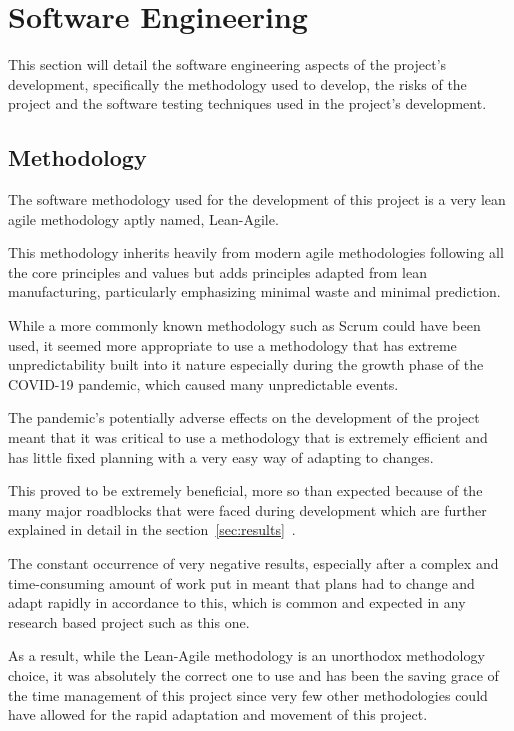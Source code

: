 \documentclass[12pt]{article}
\newcommand{\sentence}{} %
\newcommand{\fullref}[1]{\ref{#1}~\nameref{#1}}
\begin{document}
    \pagebreak


    \section{Software Engineering}\label{sec:software-engineering}

    \tab
    This section will detail the software engineering aspects of the project's development, specifically the
    methodology used to develop, the risks of the project and the software testing techniques used in the project's
    development.

    \subsection{Methodology}\label{subsec:methodology}

    \tab
    The software methodology used for the development of this project is a very lean agile methodology aptly named,
    Lean-Agile.
    \sentence
    This methodology inherits heavily from modern agile methodologies following all the core principles and values
    but adds principles adapted from lean manufacturing, particularly emphasizing minimal waste and minimal
    prediction.
    \sentence
    While a more commonly known methodology such as Scrum could have been used, it seemed more appropriate to use a
    methodology that has extreme unpredictability built into it nature especially during the growth phase of the
    COVID-19 pandemic, which caused many unpredictable events.
    \sentence
    The pandemic's potentially adverse effects on the development of the project meant that it was critical to use a
    methodology that is extremely efficient and has little fixed planning with a very easy way of adapting to changes.
    \sentence
    This proved to be extremely beneficial, more so than expected because of the many major roadblocks that were
    faced during development which are further explained in detail in the section~\fullref{sec:results}.
    \sentence
    The constant occurrence of very negative results, especially after a complex and time-consuming amount of work
    put in meant that plans had to change and adapt rapidly in accordance to this, which is common and expected in
    any research based project such as this one.
    \sentence
    As a result, while the Lean-Agile methodology is an unorthodox methodology choice, it was absolutely the correct
    one to use and has been the saving grace of the time management of this project since very few other
    methodologies could have allowed for the rapid adaptation and movement of this project.
\end{document}
